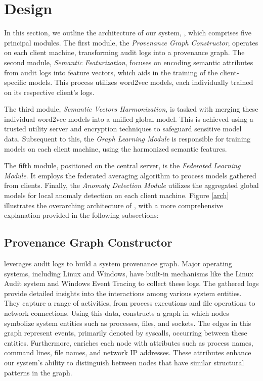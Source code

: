 \section{\Sys Design}
\label{sec:methodology}

In this section, we outline the architecture of our system, \Sys, which comprises five principal modules. The first module, the \textit{Provenance Graph Constructor}, operates on each client machine, transforming audit logs into a provenance graph. The second module, \textit{Semantic Featurization}, focuses on encoding semantic attributes from audit logs into feature vectors, which aids in the training of the client-specific \gnnshort models. This process utilizes word2vec models, each individually trained on its respective client's logs.

The third module, \textit{Semantic Vectors Harmonization}, is tasked with merging these individual word2vec models into a unified global model. This is achieved using a trusted utility server and encryption techniques to safeguard sensitive model data. Subsequent to this, the \textit{Graph Learning Module} is responsible for training \gnnshort models on each client machine, using the harmonized semantic features.

The fifth module, positioned on the central server, is the \textit{Federated Learning Module}. It employs the federated averaging algorithm to process \gnnshort models gathered from clients. Finally, the \textit{Anomaly Detection Module} utilizes the aggregated global models for local anomaly detection on each client machine. Figure \ref{arch} illustrates the overarching architecture of \Sys, with a more comprehensive explanation provided in the following subsections:

\subsection{Provenance Graph Constructor} 
\Sys leverages audit logs to build a system provenance graph. Major operating systems, including Linux and Windows, have built-in mechanisms like the Linux Audit system and Windows Event Tracing to collect these logs. The gathered logs provide detailed insights into the interactions among various system entities. They capture a range of activities, from process executions and file operations to network connections. Using this data, \Sys constructs a graph in which nodes symbolize system entities such as processes, files, and sockets. The edges in this graph represent events, primarily denoted by syscalls, occurring between these entities. Furthermore, \Sys enriches each node with attributes such as process names, command lines, file names, and network IP addresses. These attributes enhance our system's ability to distinguish between nodes that have similar structural patterns in the graph.


